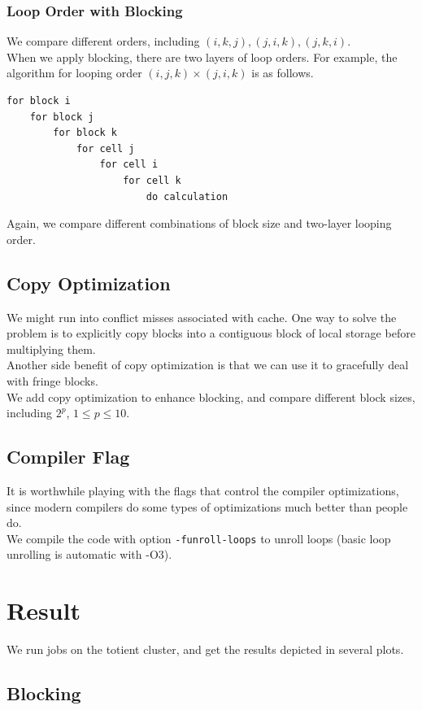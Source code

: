 \documentclass[12pt]{article}
\numberwithin{equation}{section}
\begin{document}
\subsubsection{Loop Order with Blocking}
We compare different orders, including $(i, k, j), (j, i, k), (j, k, i)$.
\\
When we apply blocking, there are two layers of loop orders. For example, the algorithm for looping order $(i, j, k)\times(j, i, k)$ is as follows.
\begin{verbatim}
for block i
    for block j
        for block k
            for cell j
                for cell i
                    for cell k
                        do calculation
\end{verbatim}
Again, we compare different combinations of block size and two-layer looping order.

\subsection{Copy Optimization}

We might run into conflict misses associated with cache. One way to solve the problem is to explicitly copy blocks into a contiguous block of local storage before multiplying them.
\\
Another side benefit of copy optimization is that we can use it to gracefully deal with fringe blocks.
\\
We add copy optimization to enhance blocking, and compare different block sizes, including $2^p$, $1 \leq p \leq 10$.

\subsection{Compiler Flag}

It is worthwhile playing with the flags that control the compiler optimizations, since modern compilers do some types of optimizations much better than people do.
\\
We compile the code with option \texttt{-funroll-loops} to unroll loops (basic loop unrolling is automatic with -O3).

\section{Result}

We run jobs on the totient cluster, and get the results depicted in several plots.

\subsection{Blocking}
\end{document}
